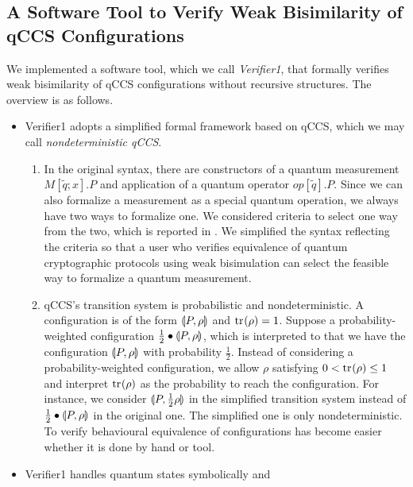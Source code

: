 \subsection{A Software Tool to Verify Weak Bisimilarity of qCCS Configurations}
We implemented a software tool, which
we call {\it Verifier1}, that formally verifies
weak bisimilarity of qCCS configurations
without recursive structures.
The overview is as follows.
 \begin{itemize}
  \item Verifier1 adopts a simplified formal framework based on qCCS,
	which we may call {\it nondeterministic qCCS}.
	\begin{enumerate}
	 \item In the original syntax, there are constructors of a quantum
	       measurement $M[\tilde q;x].P$
	       and application of a quantum operator $\mathit{op}[\tilde
	       q].P$. Since we can also formalize
	       a measurement as a special quantum operation,
	       we always have two ways to
	       formalize one. We considered criteria
	       to select one way from the two, which is
	       reported in \cite{Kubota2012}. 
	       We simplified the syntax reflecting the
	       criteria so that
	       a user who verifies equivalence of
	       quantum cryptographic protocols using weak bisimulation
	       can select the
	       feasible way to formalize a quantum measurement.
	 \item qCCS's transition system
	       is probabilistic
	       and nondeterministic. A configuration is of the form
	       $\llparenthesis P, \rho \rrparenthesis$ and ${\rm tr}_{}(\rho) = 1$. Suppose a 
	       probability-weighted configuration $\frac{1}{2} \bullet
	       \llparenthesis P, \rho \rrparenthesis$, which is interpreted to that we have
	       the configuration $\llparenthesis P, \rho \rrparenthesis$ with probability
	       $\frac{1}{2}$.
	       Instead of considering a
	       probability-weighted configuration, we
	       allow $\rho$ satisfying $0 < {\rm tr}_{}(\rho) \le
	       1$ and
	       interpret ${\rm tr}_{}(\rho)$ as the probability to reach the
	       configuration. For instance, we consider
	       $\llparenthesis P, \frac{1}{2}\rho \rrparenthesis$ in
	       the simplified transition system instead of $\frac{1}{2}
	       \bullet \llparenthesis P, \rho \rrparenthesis$ in the original one.
	       The simplified one is only nondeterministic.
	       To verify behavioural equivalence of
	       configurations has become easier whether
	       it is done by hand or tool.
	\end{enumerate}
  \item Verifier1 handles quantum states symbolically and

\end{itemize}
